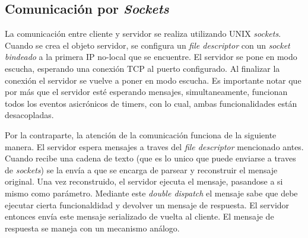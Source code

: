     \subsection{Comunicaci\'on por \textit{Sockets}}
      La comunicaci\'on entre cliente y servidor se realiza utilizando \textsc{UNIX}
      \textit{sockets}.
      Cuando se crea el objeto servidor, se configura un \textit{file descriptor} con
      un \textit{socket} \textit{bindeado} a la primera IP no-local que se encuentre.
      El servidor se pone en modo escucha, esperando una conexi\'on \textsc{TCP}
      al puerto configurado. Al finalizar la conexi\'on el servidor se vuelve a poner
      en modo escucha.
      Es importante notar que por m\'as que el servidor est\'e esperando mensajes,
      simultaneamente, funcionan todos los eventos asicr\'onicos de timers, con lo cual,
      ambas funcionalidades est\'an desacopladas.

      Por la contraparte, la atenci\'on de la comunicaci\'on funciona de la siguiente manera.
      El servidor espera mensajes a traves del \textit{file descriptor} mencionado antes.
      Cuando recibe una cadena de texto (que es lo unico que puede enviarse a traves de
      \textit{sockets}) se la env\'ia a \constructorMensajes{} que se encarga de
      parsear y reconstruir el mensaje original.
      Una vez reconstruido, el servidor ejecuta el mensaje, pasandose a si mismo como par\'ametro.
      Mediante este \textit{double dispatch} el mensaje sabe que debe ejecutar cierta funcionaldidad
      y devolver un mensaje de respuesta. El servidor entonces env\'ia este mensaje serializado
      de vuelta al cliente. El mensaje de respuesta se maneja con un mecanismo an\'alogo.
